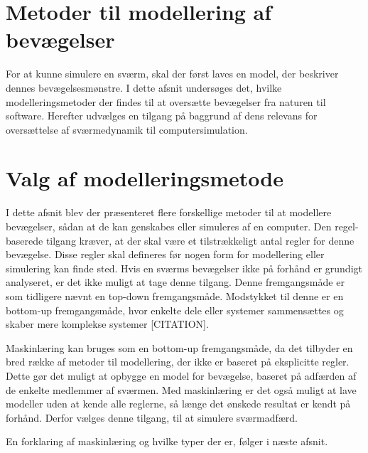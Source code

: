 \section*{Metoder til modellering af bevægelser}
For at kunne simulere en sværm, skal der først laves en model, der beskriver dennes bevægelsesmønstre. I dette afsnit undersøges det, hvilke modelleringsmetoder der findes til at oversætte bevægelser fra naturen til software. Herefter udvælges en tilgang på baggrund af dens relevans for oversættelse af sværmedynamik til computersimulation.

\section*{Valg af modelleringsmetode}
I dette afsnit blev der præsenteret flere forskellige metoder til at modellere bevægelser, sådan at de kan genskabes eller simuleres af en computer. Den regel-baserede tilgang kræver, at der skal være et tilstrækkeligt antal regler for denne bevægelse. Disse regler skal defineres før nogen form for modellering eller simulering kan finde sted. Hvis en sværms bevægelser ikke på forhånd er grundigt analyseret, er det ikke muligt at tage denne tilgang. Denne fremgangsmåde er som tidligere nævnt en top-down fremgangsmåde. Modstykket til denne er en bottom-up fremgangsmåde, hvor enkelte dele eller systemer sammensættes og skaber mere komplekse systemer [CITATION].
\par
Maskinlæring kan bruges som en bottom-up fremgangsmåde, da det tilbyder en bred række af metoder til modellering, der ikke er baseret på eksplicitte regler. Dette gør det muligt at opbygge en model for bevægelse, baseret på adfærden af de enkelte medlemmer af sværmen. Med maskinlæring er det også muligt at lave modeller uden at kende alle reglerne, så længe det ønskede resultat er kendt på forhånd. Derfor vælges denne tilgang, til at simulere sværmadfærd.
\par
En forklaring af maskinlæring og hvilke typer der er, følger i næste afsnit.